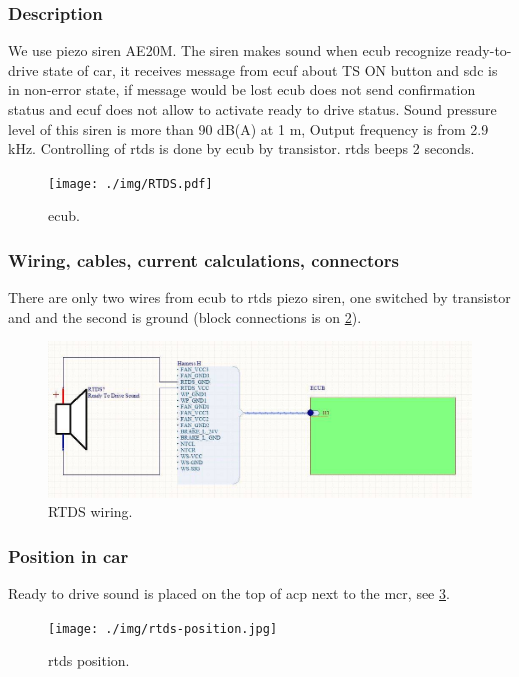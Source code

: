 
\subsubsection{Description}

We use piezo siren AE20M. The siren makes sound when \gls{ecub} recognize ready-to-drive state of car, it receives message from \gls{ecuf} about TS ON button and \gls{sdc} is in non-error state, if message would be lost \gls{ecub} does not send confirmation status and \gls{ecuf} does not allow to activate ready to drive status. Sound pressure level of this siren is more than 90 dB(A) at 1 m, Output frequency is from 2.9 kHz. Controlling of \gls{rtds} is done by \gls{ecub} by transistor. \gls{rtds} beeps 2 seconds.

\begin{figure}[H]
	\centering
	\texttt{[image: ./img/RTDS.pdf]}
	\caption{\gls{ecub}.}
	\label{fig:RTDS}
\end{figure}

\subsubsection{Wiring, cables, current calculations, connectors}

There are only two wires from \gls{ecub} to \gls{rtds} piezo siren, one switched by transistor and and the second is ground (block connections is on \ref{fig:RTDS-wiring}).

\begin{figure}[H]
	\centering
	\includegraphics[width=\textwidth]{./img/rtds-wiring.jpg}
	\caption{RTDS wiring.}
	\label{fig:RTDS-wiring}
\end{figure}
\subsubsection{Position in car}

Ready to drive sound is placed on the top of \gls{acp} next to the \gls{mcr}, see \ref{fig:RTDS-position}.
\begin{figure}[H]
	\centering
	\texttt{[image: ./img/rtds-position.jpg]}
	\caption{\Gls{rtds} position.}
	\label{fig:RTDS-position}
\end{figure}